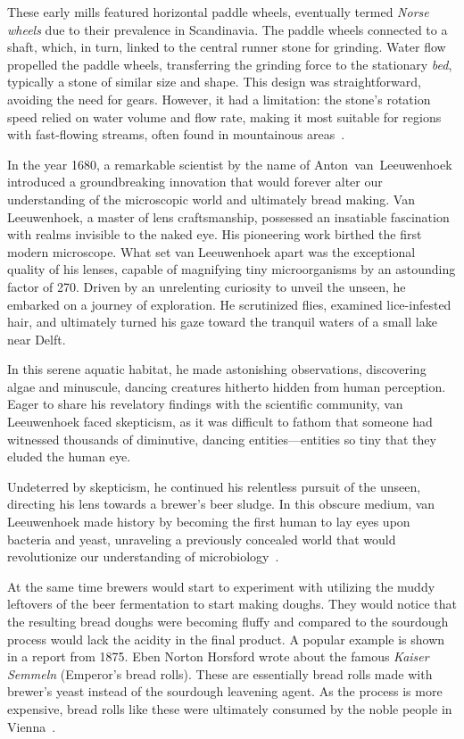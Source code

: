 These early mills featured horizontal paddle wheels, eventually
termed \emph{Norse wheels} due to their prevalence in Scandinavia.
The paddle wheels connected to a shaft, which, in turn, linked to the central
runner stone for grinding. Water flow propelled the paddle wheels,
transferring the grinding force to the stationary \emph{bed}, typically
a stone of similar size and shape. This design was straightforward, avoiding
the need for gears. However, it had a limitation: the
stone's rotation speed relied on water volume and flow
rate, making it most suitable for regions with fast-flowing
streams, often found in mountainous areas~\cite{mills+scandinavia}.

In the year \num{1680}, a remarkable scientist by the
name of Anton~van~Leeuwenhoek
introduced a groundbreaking innovation that would
forever alter our understanding
of the microscopic world and ultimately bread making.
Van Leeuwenhoek, a master of lens craftsmanship,
possessed an insatiable fascination with realms
invisible to the naked eye. His pioneering work birthed
the first modern microscope.
What set van Leeuwenhoek apart was the exceptional quality of his lenses,
capable of magnifying tiny microorganisms by an astounding factor of \num{270}.
Driven by an unrelenting curiosity to unveil the unseen, he embarked on a
journey of exploration. He scrutinized flies, examined lice-infested hair,
and ultimately turned his gaze toward the tranquil waters of a small
lake near Delft.

In this serene aquatic habitat, he made astonishing observations,
discovering algae and minuscule, dancing creatures hitherto hidden from
human perception. Eager to share his revelatory findings with the scientific
community, van Leeuwenhoek faced skepticism, as it was difficult to fathom that
someone had witnessed thousands of diminutive, dancing entities—entities
so tiny that they eluded the human eye.

Undeterred by skepticism, he continued his relentless pursuit of the unseen,
directing his lens towards a brewer's beer sludge. In this obscure medium,
van Leeuwenhoek made history by becoming the first human to lay eyes upon
bacteria and yeast, unraveling a previously concealed world that would
revolutionize our understanding of microbiology~\cite{Yong+2017+Leeuwen}.

At the same time brewers would start to experiment with utilizing the muddy leftovers
of the beer fermentation to start making doughs. They would notice
that the resulting bread doughs were becoming fluffy and compared
to the sourdough process would lack the acidity in the final product.
A popular example is shown in a report from \num{1875}. Eben Norton Horsford
wrote about the famous \emph{Kaiser Semmeln} (Emperor's bread rolls).
These are essentially bread rolls made with brewer's yeast instead
of the sourdough leavening agent. As the process is more expensive,
bread rolls like these were ultimately consumed by the noble people
in Vienna~\cite{vienna+breadrolls}.

